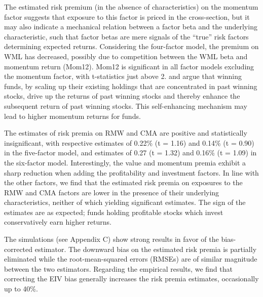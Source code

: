 \vspace{-0.45cm}
\par The estimated risk premium (in the absence of characteristics) on the momentum factor suggests that exposure to this factor is priced in the cross-section, but it may also indicate a mechanical relation between a factor beta and the underlying characteristic, such that factor betas are mere signals of the ``true'' risk factors determining expected returns. Considering the four-factor model, the premium on WML has decreased, possibly due to competition between the WML beta and momentum return (Mom12). Mom12 is significant in all factor models excluding the momentum factor, with t-statistics just above 2. \citet{lou2012flow} and \citet{vayanos2013institutional} argue that winning funds, by scaling up their existing holdings that are concentrated in past winning stocks, drive up the returns of past winning stocks and thereby enhance the subsequent return of past winning stocks. This self-enhancing mechanism may lead to higher momentum returns for funds. 
\par The estimates of risk premia on RMW and CMA are positive and statistically insignificant, with respective estimates of 0.22\% (t = 1.16) and 0.14\% (t = 0.90) in the five-factor model, and estimates of 0.27 (t = 1.32) and 0.16\% (t = 1.09) in the six-factor model. Interestingly, the value and momentum premia exhibit a sharp reduction when adding the profitability and investment factors. In line with the other factors, we find that the estimated risk premia on exposures to the RMW and CMA factors are lower in the presence of their underlying characteristics, neither of which yielding significant estimates. The sign of the estimates are as expected; funds holding profitable stocks which invest conservatively earn higher returns. 
\par The simulations (see Appendix C) show strong results in favor of the bias-corrected estimator. The downward bias on the estimated risk premia is partially eliminated while the root-mean-squared errors (RMSEs) are of similar magnitude between the two estimators. Regarding the empirical results, we find that correcting the EIV bias generally increases the risk premia estimates, occasionally up to 40\%. 

